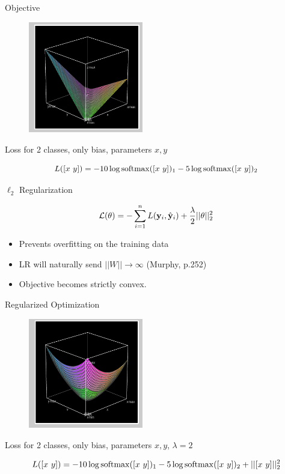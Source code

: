 \documentclass{beamer}
\begin{document}
\begin{frame}{Objective}
  \begin{figure}
    \centering
    \includegraphics[width=5cm]{lrobj}
  \end{figure}

  \begin{center}
    Loss for 2 classes, only bias, parameters $x, y$
  \end{center}
  \[ L([x\ y]) = - 10 \log \softmax([x\ y])_1 -5\log \softmax([x\ y])_2 \]

\end{frame}

\begin{frame}{$\ell_2$ Regularization}

  \[ \mathcal{L}(\theta) = - \sum_{i=1}^n L(\mathbf{y}_i, \hat{\mathbf{y}}_i) + \frac{\lambda}{2} ||\theta||^2_2\]
  \begin{itemize}
  \item Prevents overfitting on the training data
  \item LR will naturally send $||W|| \rightarrow \infty$ (Murphy, p.252)
  \item Objective becomes strictly convex.
  \end{itemize}

\end{frame}


\begin{frame}{Regularized Optimization}
  \begin{figure}
    \centering
    \includegraphics[width=5cm]{lrobjl2}
  \end{figure}

  \begin{center}
    Loss for 2 classes, only bias, parameters $x, y$, $\lambda=2$
  \end{center}
  \[ L([x\ y]) = - 10 \log \softmax([x\ y])_1 -5\log \softmax([x\ y])_2 + ||[x\ y]||_2^2\]

\end{frame}
\end{document}
